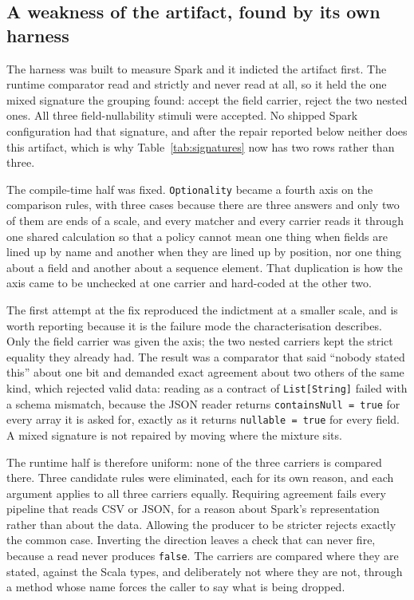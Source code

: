 \subsection{A weakness of the artifact, found by its own harness}
\label{sec:weakness}

The harness was built to measure Spark and it indicted the artifact first. The runtime comparator read  and  strictly and never read  at all, so it held the one mixed signature the grouping found: accept the field carrier, reject the two nested ones. All three field-nullability stimuli were accepted. No shipped Spark configuration had that signature, and after the repair reported below neither does this artifact, which is why Table~\ref{tab:signatures} now has two rows rather than three.

The compile-time half was fixed. \texttt{Optionality} became a fourth axis on the comparison rules, with three cases because there are three answers and only two of them are ends of a scale, and every matcher and every carrier reads it through one shared calculation so that a policy cannot mean one thing when fields are lined up by name and another when they are lined up by position, nor one thing about a field and another about a sequence element. That duplication is how the axis came to be unchecked at one carrier and hard-coded at the other two.

The first attempt at the fix reproduced the indictment at a smaller scale, and is worth reporting because it is the failure mode the characterisation describes. Only the field carrier was given the axis; the two nested carriers kept the strict equality they already had. The result was a comparator that said ``nobody stated this'' about one bit and demanded exact agreement about two others of the same kind, which rejected valid data: reading  as a contract of \texttt{List[String]} failed with a schema mismatch, because the JSON reader returns \texttt{containsNull = true} for every array it is asked for, exactly as it returns \texttt{nullable = true} for every field. A mixed signature is not repaired by moving where the mixture sits.

The runtime half is therefore uniform: none of the three carriers is compared there. Three candidate rules were eliminated, each for its own reason, and each argument applies to all three carriers equally. Requiring agreement fails every pipeline that reads CSV or JSON, for a reason about Spark's representation rather than about the data. Allowing the producer to be stricter rejects exactly the common case. Inverting the direction leaves a check that can never fire, because a read never produces \texttt{false}. The carriers are compared where they are stated, against the Scala types, and deliberately not where they are not, through a method whose name forces the caller to say what is being dropped.

